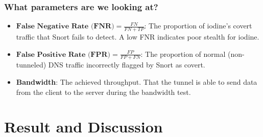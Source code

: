\documentclass{beamer}
\begin{document}

\begin{frame}
\frametitle{What parameters are we looking at?}

\begin{itemize}
    \item<1-> $\textbf{False Negative Rate (FNR)}= \frac{FN}{FN+TP}$: The proportion of iodine’s covert traffic that Snort fails to detect. A low FNR indicates poor stealth for iodine.
    \item<2-> $\textbf{False Positive Rate (FPR)}= \frac{FP}{FP+FN}$: The proportion of normal (non-tunneled) DNS traffic incorrectly
flagged by Snort as covert.
    \item<3-> \textbf{Bandwidth}: The achieved throughput. That the tunnel is able to send data from the client to the server during the bandwidth test.
\end{itemize}
\end{frame}


\section{Result and Discussion}
\end{document}
